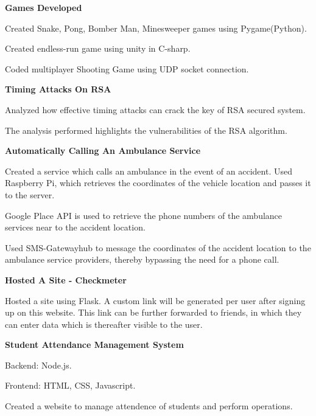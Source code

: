 \begin{cventries}
  \cventry
    { \textbf{Games Developed} }{}{}{}
    {
      \begin{cvitems}
        \item {Created Snake, Pong, Bomber Man, Minesweeper games using Pygame(Python).}
        \item {Created endless-run game using unity in C-sharp.}
        \item {Coded multiplayer Shooting Game using UDP socket connection.}
      \end{cvitems}
    }
  \cventry
    {\textbf{Timing Attacks On RSA}}{}{}{}
    {
      \begin{cvitems}
        \item {Analyzed how effective timing attacks can crack the key of RSA secured system.}
        \item {The analysis performed highlights the vulnerabilities of the RSA algorithm.}
      \end{cvitems}
    }
  \cventry
    { \textbf{ Automatically Calling An Ambulance Service } }{}{}{}
    {
      \begin{cvitems}
        \item {Created a service which calls an ambulance in the event of an accident. Used Raspberry Pi, which retrieves the coordinates of the vehicle location and passes it to the server.}
        \item {Google Place API is used to retrieve the phone numbers of the ambulance services near to the accident location.}
        \item {Used SMS-Gatewayhub to message the coordinates of the accident location to the ambulance service providers, thereby bypassing the need for a phone call.}
      \end{cvitems}
    }
  \cventry
    { \textbf{ Hosted A Site - Checkmeter } }{}{}{}
    {
      \begin{cvitems}
        \item {Hosted a site using Flask. A custom link will be generated per user after signing up on this website. This link can be further forwarded to friends, in which they can enter data which is thereafter visible to the user.}
      \end{cvitems}
    }
  \cventry
    { \textbf{ Student Attendance Management System } }{}{}{}
    {
      \begin{cvitems}
        \item {Backend: Node.js.}
        \item {Frontend: HTML, CSS, Javascript.}
        \item {Created a website to manage attendence of students and perform operations.}
      \end{cvitems}
    }
  
\end{cventries}
